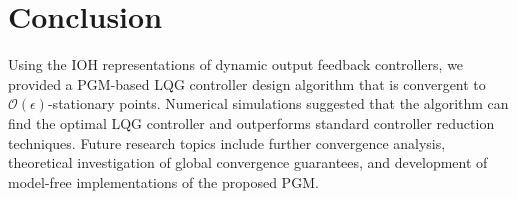 \documentclass[preprint,5p,times,twocolumn]{elsarticle}
\newcommand{\bm}[1]{{\mbox{\boldmath $#1$}}}
\def\rmsK{{}^{\rm s}\hspace{-0.4mm}}
\begin{document}


\section{Conclusion}
Using the IOH representations of dynamic output feedback controllers, we provided a PGM-based LQG controller design algorithm that is convergent to $\mathcal O(\epsilon)$-stationary points. Numerical simulations suggested that the algorithm can find the optimal LQG controller and outperforms standard controller reduction techniques. Future research topics include further convergence analysis, theoretical investigation of global convergence guarantees, and development of model-free implementations of the proposed PGM. 

\appendix
\end{document}
